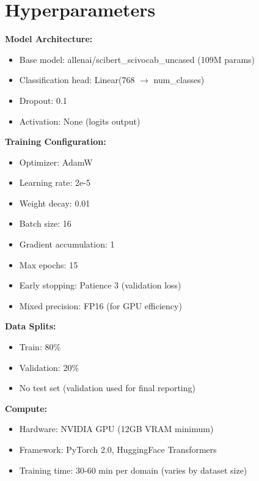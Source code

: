 \documentclass{article}
\begin{document}
\appendix

\section{Hyperparameters}

\textbf{Model Architecture:}
\begin{itemize}
    \item Base model: allenai/scibert\_scivocab\_uncased (109M params)
    \item Classification head: Linear(768 $\rightarrow$ num\_classes)
    \item Dropout: 0.1
    \item Activation: None (logits output)
\end{itemize}

\textbf{Training Configuration:}
\begin{itemize}
    \item Optimizer: AdamW
    \item Learning rate: 2e-5
    \item Weight decay: 0.01
    \item Batch size: 16
    \item Gradient accumulation: 1
    \item Max epochs: 15
    \item Early stopping: Patience 3 (validation loss)
    \item Mixed precision: FP16 (for GPU efficiency)
\end{itemize}

\textbf{Data Splits:}
\begin{itemize}
    \item Train: 80\%
    \item Validation: 20\%
    \item No test set (validation used for final reporting)
\end{itemize}

\textbf{Compute:}
\begin{itemize}
    \item Hardware: NVIDIA GPU (12GB VRAM minimum)
    \item Framework: PyTorch 2.0, HuggingFace Transformers
    \item Training time: 30-60 min per domain (varies by dataset size)
\end{itemize}
\end{document}
